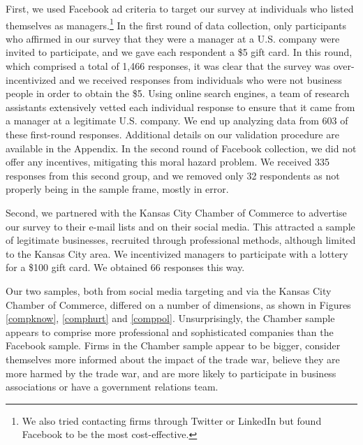 \documentclass{article}
\begin{document}
First, we used Facebook ad criteria to target our survey at individuals who listed themselves as managers.\footnote{We also tried contacting firms through Twitter or LinkedIn but found Facebook to be the most cost-effective.} In the first round of data collection, only participants who affirmed in our survey that they were a manager at a U.S. company were invited to participate, and we gave each respondent a \$5 gift card. In this round, which comprised a total of 1,466 responses, it was clear that the survey was over-incentivized and we received responses from individuals who were not business people in order to obtain the \$5. Using online search engines, a team of research assistants extensively vetted each individual response to ensure that it came from a manager at a legitimate U.S. company. We end up analyzing data from 603 of these first-round responses. Additional details on our validation procedure are available in the Appendix. In the second round of Facebook collection, we did not offer any incentives,  mitigating this moral hazard problem. We received 335 responses from this second group, and we removed only 32 respondents as not properly being in the sample frame, mostly in error.

Second, we partnered with the Kansas City Chamber of Commerce to advertise our survey to their e-mail lists and on their social media. This attracted a sample of legitimate businesses, recruited through professional methods, although limited to the Kansas City area. We incentivized managers to participate with a lottery for a \$100 gift card. We obtained 66 responses this way.



Our two samples, both from social media targeting and via the Kansas City Chamber of Commerce, differed on a number of dimensions, as shown in Figures \ref{compknow}, \ref{comphurt} and \ref{comppol}. Unsurprisingly, the Chamber sample appears to comprise more professional and sophisticated companies than the Facebook sample. Firms in the Chamber sample appear to be bigger, consider themselves more informed about the impact of the trade war, believe they are more harmed by the trade war, and are more likely to participate in business associations or have a government relations team.
\end{document}
